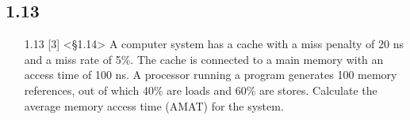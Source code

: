 \documentclass{article}
\begin{document}
\subsection*{1.13}
\begin{enumerate}
    \item[1.13] [3] <§1.14> A computer system has a cache with a miss penalty of 20 ns and a miss rate of 5\%. The cache is connected to a main memory with an access time of 100 ns. A processor running a program generates 100 memory references, out of which 40\% are loads and 60\% are stores. Calculate the average memory access time (AMAT) for the system.
\end{enumerate}
\end{document}
